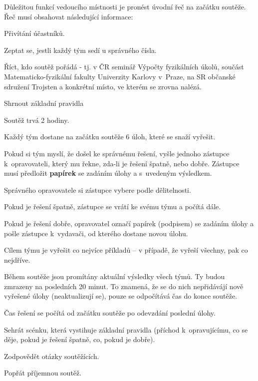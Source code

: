 \documentclass[vyfuk,\classoptions]{fksempty}
\begin{document}
Důležitou funkcí vedoucího místnosti je pronést úvodní řeč na začátku soutěže.
Řeč musí obsahovat následující informace:
\begin{compactitem}
	\item Přivítání účastníků.
	\item Zeptat se, jestli každý tým sedí u správného čísla.
	\item Říct, kdo soutěž pořádá - tj. v ČR seminář Výpočty fyzikálních úkolů, součást 
	Matematicko-fyzikální fakulty Univerzity Karlovy
	v~Praze, na SR občanské sdružení Trojsten a konkrétní místo, ve kterém se zrovna nalézá.
	\item Shrnout základní pravidla
		\begin{compactenum}
			\item Soutěž trvá 2 hodiny.
  			\item Každý tým dostane na začátku soutěže 6 úloh, které se snaží vyřešit.
  			\item Pokud si tým myslí, že došel ke správnému řešení,
  					vyšle jednoho zástupce k~opravovateli, který mu řekne,
  					zda-li je řešení špatně, nebo dobře.
  					Zástupce musí předložit {\bf papírek} se zadáním úlohy a s~uvedeným výsledkem.
  			\item Správného opravovatele si zástupce vybere podle dělitelnosti.
  			\item Pokud je řešení špatně,
  					zástupce se vrátí ke svému týmu a počítá dále.
  			\item Pokud je řešení dobře,
  					opravovatel označí papírek (podpisem) se zadáním úlohy 
  					a pošle zástupce k~vydavači, od kterého dostane novou úlohu.
  			\item Cílem týmu je vyřešit co nejvíce příkladů -- v případě, že vyřeší
			všechny, pak co nejdříve.
  			\item Během soutěže jsou promítány aktuální výsledky všech týmů.
  				Ty budou zmrazeny na posledních 20 minut. To znamená, že se do nich
				nepřidávájí nově vyřešené úlohy (neaktualizují se), pouze se
				odpočítává čas do konce soutěže.
			\item Čas řešení se počítá od začátku soutěže po odevzdání poslední úlohy.
		\end{compactenum}
		
	\item Sehrát scénku, která vystihuje základní pravidla (příchod 
	k~opravujícímu, co se děje, pokud je řešení špatně, co, pokud je dobře).
	\item Zodpovědět otázky soutěžících.
	\item Popřát příjemnou soutěž.
\end{compactitem}
\end{document}

